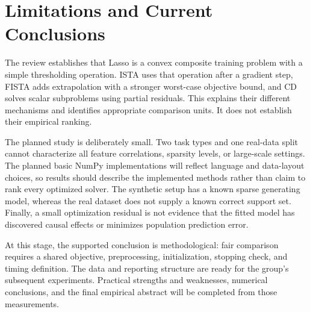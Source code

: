 \documentclass[11pt,a4paper]{article}
\begin{document}
\section{Limitations and Current Conclusions}
The review establishes that Lasso is a convex composite training problem with a simple thresholding operation. ISTA uses that operation after a gradient step, FISTA adds extrapolation with a stronger worst-case objective bound, and CD solves scalar subproblems using partial residuals. This explains their different mechanisms and identifies appropriate comparison units. It does not establish their empirical ranking.

The planned study is deliberately small. Two task types and one real-data split cannot characterize all feature correlations, sparsity levels, or large-scale settings. The planned basic NumPy implementations will reflect language and data-layout choices, so results should describe the implemented methods rather than claim to rank every optimized solver. The synthetic setup has a known sparse generating model, whereas the real dataset does not supply a known correct support set. Finally, a small optimization residual is not evidence that the fitted model has discovered causal effects or minimizes population prediction error.

At this stage, the supported conclusion is methodological: fair comparison requires a shared objective, preprocessing, initialization, stopping check, and timing definition. The data and reporting structure are ready for the group's subsequent experiments. Practical strengths and weaknesses, numerical conclusions, and the final empirical abstract will be completed from those measurements.
\end{document}

